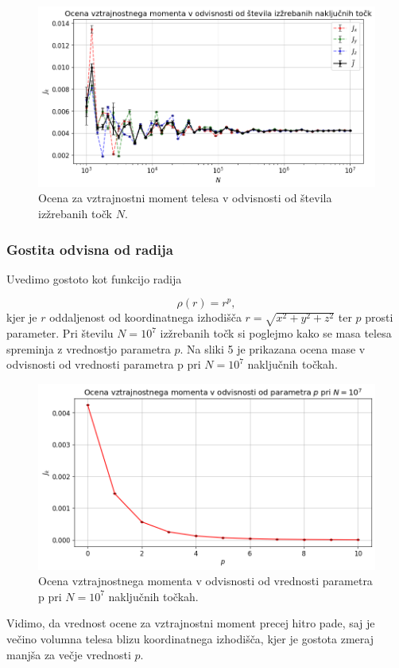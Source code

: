 \documentclass[slovene,11pt,a4paper]{article}
\begin{document}
\begin{figure}[h!]
\centering
\includegraphics[width=13cm]{telo5.png}
\caption{Ocena za vztrajnostni moment telesa v odvisnosti od števila izžrebanih točk $N$.}
\end{figure}

\subsubsection{Gostita odvisna od radija}

Uvedimo gostoto kot funkcijo radija

\begin{equation}
\rho(r) = r^p,
\end{equation}
kjer je $r$ oddaljenost od koordinatnega izhodišča $r = \sqrt{x^2+y^2+z^2}$ ter $p$ prosti parameter. Pri številu $N=10^7$ izžrebanih točk si poglejmo kako se masa telesa spreminja z vrednostjo parametra $p$. Na sliki 5 je prikazana ocena mase v odvisnosti od vrednosti parametra p pri $N=10^7$ naključnih točkah.

\begin{figure}[h!]
\centering
\includegraphics[width=13cm]{telo6.png}
\caption{Ocena vztrajnostnega momenta v odvisnosti od vrednosti parametra p pri $N=10^7$ naključnih točkah.}
\end{figure}
\noindent Vidimo, da vrednost ocene za vztrajnostni moment precej hitro pade, saj je večino volumna telesa blizu koordinatnega izhodišča, kjer je gostota zmeraj manjša za večje vrednosti $p$.
\end{document}

